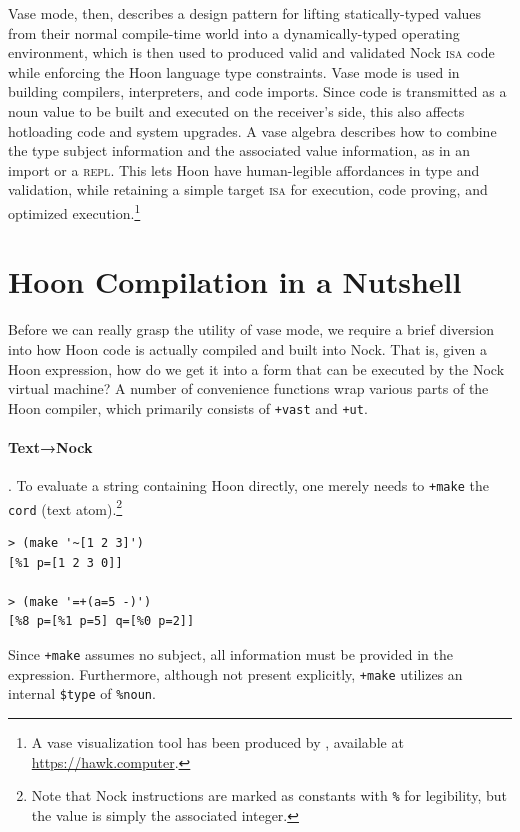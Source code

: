 \documentclass[twoside]{article}
\begin{document}
\sloppy
Vase mode, then, describes a design pattern for lifting statically-typed values from their normal compile-time world into a dynamically-typed operating environment, which is then used to produced valid and validated Nock \textsc{isa} code while enforcing the Hoon language type constraints.  Vase mode is used in building compilers, interpreters, and code imports.  Since code is transmitted as a noun value to be built and executed on the receiver's side, this also affects hotloading code and system upgrades.  A vase algebra describes how to combine the type subject information and the associated value information, as in an import or a \textsc{repl}.  This lets Hoon have human-legible affordances in type and validation, while retaining a simple target \textsc{isa} for execution, code proving, and optimized execution.\footnote{A vase visualization tool has been produced by , available at \url{https://hawk.computer}.}

\section{Hoon Compilation in a Nutshell}

Before we can really grasp the utility of vase mode, we require a brief diversion into how Hoon code is actually compiled and built into Nock.  That is, given a Hoon expression, how do we get it into a form that can be executed by the Nock virtual machine?  A number of convenience functions wrap various parts of the Hoon compiler, which primarily consists of \lstinline[style=inlinecode]{+vast} and \lstinline[style=inlinecode]{+ut}.

\paragraph{Text→Nock}.  To evaluate a string containing Hoon directly, one merely needs to \lstinline[style=inlinecode]{+make} the \lstinline[style=inlinecode]{cord} (text atom).\footnote{Note that Nock instructions are marked as constants with \texttt{\%} for legibility, but the value is simply the associated integer.}

\begin{lstlisting}[style=listingcode]
> (make '~[1 2 3]')
[%1 p=[1 2 3 0]]

> (make '=+(a=5 -)')
[%8 p=[%1 p=5] q=[%0 p=2]]
\end{lstlisting}

\noindent
Since \lstinline[style=inlinecode]{+make} assumes no subject, all information must be provided in the expression.  Furthermore, although not present explicitly, \lstinline[style=inlinecode]{+make} utilizes an internal \lstinline[style=inlinecode]{$type} of \lstinline[style=inlinecode]{%noun}.
\end{document}
